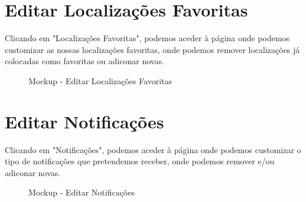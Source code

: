 \documentclass[a4paper,12pt]{scrreprt}
\newcommand{\tab}{
    \hspace{1cm}}
\begin{document}
\section{Editar Localizações Favoritas}

\tab Clicando em "Localizações Favoritas", podemos aceder à página onde podemos customizar as nossas localizações favoritas, onde podemos remover localizações já colocadas como favoritas ou adiconar novas. 

\vspace{1cm}

\begin{figure}[hbt!]
    \centering
    \caption{Mockup - Editar Localizações Favoritas}
\end{figure}
\clearpage

\section{Editar Notificações}

\tab Clicando em "Notificações", podemos aceder à página onde podemos customizar o tipo de notificações que pretendemos receber, onde podemos remover e/ou adiconar novas. 

\vspace{1cm}

\begin{figure}[hbt!]
    \centering
    \caption{Mockup - Editar Notificações}
\end{figure}
\clearpage
\end{document}
